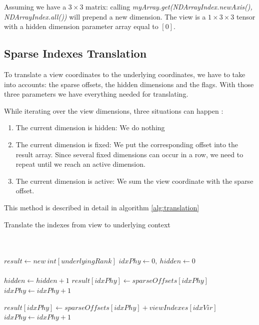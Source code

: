 Assuming we have a $3\times 3$ matrix: calling \textit{myArray.get(NDArrayIndex.newAxis(), NDArrayIndex.all())} will prepend a new dimension. The view is a $1\times 3\times 3$ tensor with a hidden dimension parameter array equal to $[0]$.

\subsection{Sparse Indexes Translation}
\label{ssec:translation}

To translate a view coordinates to the underlying coordinates, we have to take into accounts: the sparse offsets, the hidden dimensions and the flags. With those three parameters we have everything needed for translating.

While iterating over the view dimensions, three situations can happen :
\begin{enumerate}
	\item The current dimension is hidden: We do nothing
	\item The current dimension is fixed: We put the corresponding offset into the result array. Since several fixed dimensions can occur in a row, we need to repeat until we reach an active dimension.
	\item The current dimension is active: We sum the view coordinate with the sparse offset.
\end{enumerate}
This method is described in detail in algorithm \ref{alg:translation} 


\begin{algorithm}
	\caption{Translate the indexes from view to underlying context}
	\label{alg:translation}
	\begin{algorithmic}
		
		\\
		\\
		\State $result \gets new\ int[underlyingRank]$
		\State $idxPhy \gets 0,\ hidden \gets 0 $
		\\
		\\
		
		\State $hidden \gets hidden + 1$
		\Else
		\State $result[idxPhy] \gets sparseOffsets[idxPhy]$ 
		\State $idxPhy \gets idxPhy + 1$
		\EndWhile\\
		
		\State $result[idxPhy] \gets sparseOffsets[idxPhy] + viewIndexes[idxVir]$ 
		\State $idxPhy \gets idxPhy + 1$
		\EndIf
		
		\EndIf
		
		\EndFor		
		\EndProcedure
	\end{algorithmic}
\end{algorithm}
